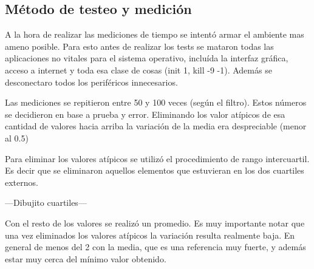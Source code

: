 \subsection*{Método de testeo y medición}

	A la hora de realizar las mediciones de tiempo se intentó armar el ambiente mas
ameno posible. Para esto antes de realizar los tests se mataron todas las aplicaciones
no vitales para el sistema operativo, incluída la interfaz gráfica, acceso a internet y
toda esa clase de cosas (init 1, kill -9 -1). Además se desconectaro todos los periféricos
innecesarios.

	Las mediciones se repitieron entre 50 y 100 veces (según el filtro). Estos números se
decidieron en base a prueba y error. Eliminando los valor atípicos de esa cantidad
de valores hacia arriba la variación de la media era despreciable (menor al 0.5)

	Para eliminar los valores atípicos se utilizó el procedimiento de rango intercuartil. Es decir
que se eliminaron aquellos elementos que estuvieran en los dos cuartiles externos.

---Dibujito cuartiles---

	Con el resto de los valores se realizó un promedio. Es muy importante notar que una vez eliminados los valores
atípicos la variación resulta realmente baja. En general de menos del 2%
con la media, que es una referencia muy fuerte, y además estar muy cerca del mínimo valor obtenido.

	

	

